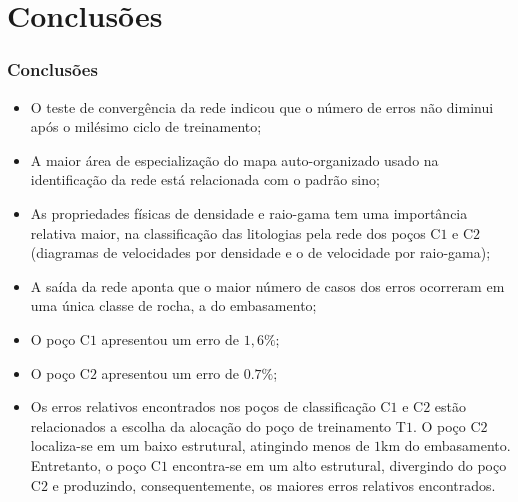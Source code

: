 \documentclass[aspectratio=10]{beamer} %
\begin{document}

\section{Conclusões}

\begin{frame}
\frametitle{Conclusões}
\begin{small}


\begin{itemize}
\item O teste de convergência da rede indicou que o número de erros não diminui após o milésimo ciclo de treinamento;
\pause
\item A maior área de especialização do mapa auto-organizado usado na identificação da rede está relacionada com o padrão sino;
\pause
\item As propriedades físicas de densidade e raio-gama tem uma importância relativa maior, na classificação das litologias pela rede dos poços  C$1$ e C$2$ (diagramas de velocidades por densidade e o de velocidade por raio-gama);
\pause
\item A saída da rede aponta que o maior número de casos dos erros ocorreram em uma única classe de rocha, a do embasamento;
\pause
\item O poço C$1$ apresentou um erro de $1,6\%$;
\pause
\item O poço C$2$ apresentou um erro de $0.7\%$;
\pause
\item Os erros relativos encontrados nos poços de classificação C$1$ e C$2$ estão relacionados a escolha da alocação do poço de treinamento T$1$. O poço C$2$ localiza-se em um baixo estrutural, atingindo menos de $1$km do embasamento. Entretanto, o poço C$1$ encontra-se em um alto estrutural, divergindo do poço C$2$ e produzindo, consequentemente, os maiores erros relativos encontrados. 
\end{itemize}
\end{small}	
\end{frame}




\end{document}
